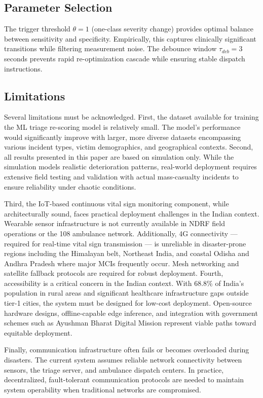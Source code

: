 \documentclass[conference]{IEEEtran}
\begin{document}
\subsection{Parameter Selection}

The trigger threshold $\theta = 1$ (one-class severity change) provides optimal balance between sensitivity and specificity. Empirically, this captures clinically significant transitions while filtering measurement noise. The debounce window $\tau_{deb} = 3$ seconds prevents rapid re-optimization cascade while ensuring stable dispatch instructions.

\subsection{Limitations}

Several limitations must be acknowledged. First, the dataset available for training the ML triage re-scoring model is relatively small. The model's performance would significantly improve with larger, more diverse datasets encompassing various incident types, victim demographics, and geographical contexts. Second, all results presented in this paper are based on simulation only. While the simulation models realistic deterioration patterns, real-world deployment requires extensive field testing and validation with actual mass-casualty incidents to ensure reliability under chaotic conditions.

Third, the IoT-based continuous vital sign monitoring component, while architecturally sound, faces practical deployment challenges in the Indian context. Wearable sensor infrastructure is not currently available in NDRF field operations or the 108 ambulance network. Additionally, 4G connectivity — required for real-time vital sign transmission — is unreliable in disaster-prone regions including the Himalayan belt, Northeast India, and coastal Odisha and Andhra Pradesh where major MCIs frequently occur. Mesh networking and satellite fallback protocols are required for robust deployment. Fourth, accessibility is a critical concern in the Indian context. With 68.8\% of India's population in rural areas \cite{census2011} and significant healthcare infrastructure gaps outside tier-1 cities, the system must be designed for low-cost deployment. Open-source hardware designs, offline-capable edge inference, and integration with government schemes such as Ayushman Bharat Digital Mission represent viable paths toward equitable deployment.

Finally, communication infrastructure often fails or becomes overloaded during disasters. The current system assumes reliable network connectivity between sensors, the triage server, and ambulance dispatch centers. In practice, decentralized, fault-tolerant communication protocols are needed to maintain system operability when traditional networks are compromised.
\end{document}
